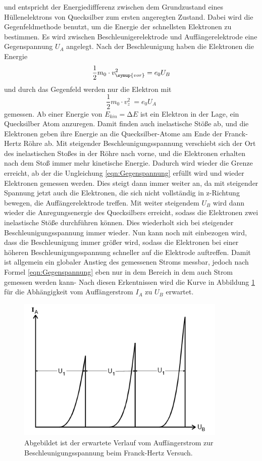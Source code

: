 und entspricht der Energiediffferenz zwischen dem Grundzustand eines Hüllenelektrons von Quecksilber zum ersten angeregten Zustand.
Dabei wird die Gegenfeldmethode benutzt, um die Energie der schnellsten Elektronen zu bestimmen.
Es wird zwischen Beschleunigerelektrode und Auffängerelektrode eine Gegenspannung $U_A$ angelegt.
Nach der Beschleunigung haben die Elektronen die Energie
\begin{equation}
    \frac{1}{2} m_0 \cdot v_{\symup{vor}}^2=e_0 U_B
    \label{eqn:Beschleunigung}
\end{equation}
und durch das Gegenfeld werden nur die Elektron mit
\begin{equation}
    \frac{1}{2} m_0 \cdot v_{z}^2 \>= e_0 U_A
    \label{eqn:Gegenspannung}
\end{equation}
gemessen.
Ab einer Energie von $E_{kin}=\increment E$ ist ein Elektron in der Lage, ein Quecksilber Atom anzuregen.
Damit finden auch inelastische Stöße ab, und die Elektronen geben ihre Energie an die Quecksilber-Atome am Ende der Franck-Hertz Röhre ab.
Mit steigender Beschleunigungsspannung verschiebt sich der Ort des inelastischen Stoßes in der Röhre nach vorne, und die Elektronen erhalten nach dem Stoß immer mehr kinetische Energie.
Dadurch wird wieder die Grenze erreicht, ab der die Ungleichung \ref{eqn:Gegenspannung} erfüllt wird und wieder Elektronen gemessen werden.
Dies steigt dann immer weiter an, da mit steigender Spannung jetzt auch die Elektronen, die sich nicht vollständig in z-Richtung bewegen, die Auffängerelektrode treffen.
Mit weiter steigendem $U_B$ wird dann wieder die Anregungsenergie des Quecksilbers erreicht, sodass die Elektronen zwei inelastische Stöße durchführen können.
Dies wiederholt sich bei steigender Beschleunigungsspannung immer wieder.
Nun kann noch mit einbezogen wird, dass die Beschleunigung immer größer wird, sodass die Elektronen bei einer höheren Beschleunigungsspannung schneller auf die Elektrode auftreffen.
Damit ist allgemein ein globaler Anstieg des gemessenen Stroms messbar, jedoch nach Formel \ref{eqn:Gegenspannung} eben nur in dem Bereich in dem auch Strom gemessen werden kann-
Nach diesen Erkentnissen wird die Kurve in Abbildung \ref{fig:Theorie} für die Abhängigkeit vom Auffängerstrom $I_A$ zu $U_B$ erwartet.

\begin{figure}[H]
    \centering
    \includegraphics[width=10cm]{Bilder/Theorie.png}
    \caption{Abgebildet ist der erwartete Verlauf vom Auffängerstrom zur Beschleunigungsspannung beim Franck-Hertz Versuch.}
    \label{fig:Theorie}
\end{figure}

